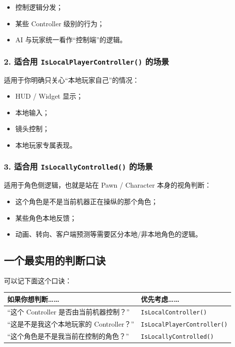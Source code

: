 \begin{itemize}
	\item 控制逻辑分发；
	\item 某些 Controller 级别的行为；
	\item AI 与玩家统一看作“控制端”的逻辑。
\end{itemize}

\subsubsection*{2. 适合用 \texttt{IsLocalPlayerController()} 的场景}

适用于你明确只关心“本地玩家自己”的情况：

\begin{itemize}
	\item HUD / Widget 显示；
	\item 本地输入；
	\item 镜头控制；
	\item 本地玩家专属表现。
\end{itemize}

\subsubsection*{3. 适合用 \texttt{IsLocallyControlled()} 的场景}

适用于角色侧逻辑，也就是站在 Pawn / Character 本身的视角判断：

\begin{itemize}
	\item 这个角色是不是当前机器正在操纵的那个角色；
	\item 某些角色本地反馈；
	\item 动画、转向、客户端预测等需要区分本地/非本地角色的逻辑。
\end{itemize}

\subsection{一个最实用的判断口诀}

可以记下面这个口诀：

\begin{center}
	\renewcommand{\arraystretch}{1.4}
	\begin{tabular}{|p{4cm}|p{9cm}|}
		\hline
		\textbf{如果你想判断……} & \textbf{优先考虑……} \\
		\hline
		“这个 Controller 是否由当前机器控制？” & \texttt{IsLocalController()} \\
		\hline
		“这是不是我这个本地玩家的 Controller？” & \texttt{IsLocalPlayerController()} \\
		\hline
		“这个角色是不是我当前在控制的角色？” & \texttt{IsLocallyControlled()} \\
		\hline
	\end{tabular}
\end{center}

